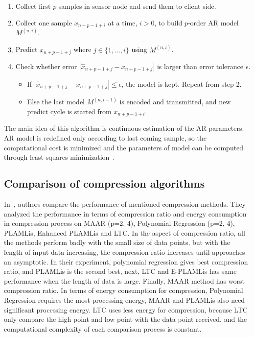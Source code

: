 \begin{enumerate}
    \item Collect first $p$ samples in sensor node and send them to client side.
    \item Collect one sample $x_{n+p-1+i}$ at a time, $i > 0$, to build
    $p$-order
    AR model $M^{(n, i)}$.
    \item Predict $x_{n+p-1+j}$ where $j \in \{1, ..., i\}$ using $M^{(n, i)}$.
    \item Check whether error $ |\hat{x}_{n+p-1+j} - x_{n+p-1+j}|$ is larger
    than error tolerance $\epsilon$.
        \begin{itemize}
            \item If $|\hat{x}_{n+p-1+j} - x_{n+p-1+j}| \leqslant \epsilon$, the
            model is kept. Repeat from step 2.
            \item Else the last model $M^{(n, i-1)}$ is encoded and transmitted,
            and new predict cycle is started from $x_{n+p-1+i}$.
        \end{itemize} 
\end{enumerate}
The main idea of this algorithm is continuous estimation of the AR parameters.
AR model is redefined only according to last coming sample, so the computational
cost is minimized and the parameters of model can be computed through least
squares minimization~\cite{zordan2012compress}.


\subsection{Comparison of compression algorithms}
In~\cite{zordan2014performance}, authors compare the performance of mentioned
compression methods. They analyzed the performance in terms of compression ratio
and energy consumption in compression process on MAAR (p={2, 4}), Polynomial
Regression (p={2, 4}), PLAMLis, Enhanced PLAMLis and LTC. In the aspect of
compression ratio, all the methods perform badly with the small size of data
points, but with the length of input data increasing, the compression ratio
increases until approaches an asymptotic. In their experiment, polynomial
regression gives best compression ratio, and PLAMLis is the second best, next,
LTC and E-PLAMLis has same performance when the length of data is large.
Finally, MAAR method has worst compression ratio. In terms of energy consumption
for compression, Polynomial Regression requires the most processing energy, MAAR
and PLAMLis also need significant processing energy. LTC uses less energy for
compression, because LTC only compare the high point and low point
with the data point received, and the computational complexity of each
comparison process is constant.
